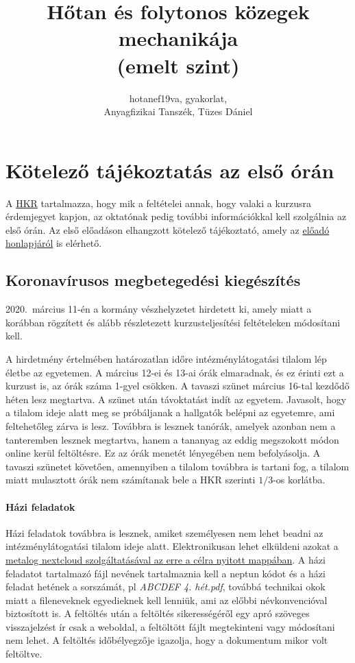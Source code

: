 \documentclass[12pt,a4paper]{scrartcl}
\begin{document}
\title{Hőtan és folytonos közegek mechanikája\\(emelt szint)}
\author{hotanef19va, gyakorlat,\\Anyagfizikai Tanszék, Tüzes Dániel}
\maketitle
\tableofcontents
\section*{Kötelező tájékoztatás az első órán}
A \href{https://www.elte.hu/file/ELTE_SZMSZ_II.pdf}{HKR} tartalmazza, hogy mik a feltételei annak, hogy valaki a kurzusra érdemjegyet kapjon, az oktatónak pedig további információkkal kell szolgálnia az első órán. Az első előadáson elhangzott kötelező tájékoztató, amely az \href{http://ispanovity.web.elte.hu/teaching/}{előadó honlapjáról} is elérhető.

\subsection{Koronavírusos megbetegedési kiegészítés}
2020.\ március 11-én a kormány vészhelyzetet hirdetett ki, amely miatt a korábban rögzített és alább részletezett kurzusteljesítési feltételeken módosítani kell.

A hirdetmény értelmében határozatlan időre intézménylátogatási tilalom lép életbe az egyetemen. A március 12-ei és 13-ai órák elmaradnak, és ez érinti ezt a kurzust is, az órák száma 1-gyel csökken. A tavaszi szünet március 16-tal kezdődő héten lesz megtartva. A szünet után távoktatást indít az egyetem. Javasolt, hogy a tilalom ideje alatt meg se próbáljanak a hallgatók belépni az egyetemre, ami feltehetőleg zárva is lesz. Továbbra is lesznek tanórák, amelyek azonban nem a tanteremben lesznek megtartva, hanem a tananyag az eddig megszokott módon online kerül feltöltésre. Ez az órák menetét lényegében nem befolyásolja. A tavaszi szünetet követően, amennyiben a tilalom továbbra is tartani fog, a tilalom miatt mulasztott órák nem számítanak bele a HKR szerinti $1/3$-os korlátba.

\paragraph{Házi feladatok} Házi feladatok továbbra is lesznek, amiket személyesen nem lehet beadni az intézménylátogatási tilalom ideje alatt. Elektronikusan lehet elküldeni azokat a \href{https://metalog.elte.hu/nextcloud/index.php/s/kBrEWKzdcGWSmsY}{metalog nextcloud szolgáltatásával az erre a célra nyitott mappában}. A házi feladatot tartalmazó fájl nevének tartalmaznia kell a neptun kódot és a házi feladat hetének a sorszámát, pl \textit{ABCDEF 4. hét.pdf}, továbbá technikai okok miatt a fileneveknek egyedieknek kell lenniük, ami az előbbi névkonvencióval biztosított is. A feltöltés után a feltöltés sikerességéről egy apró szöveges visszajelzést ír csak a weboldal, a feltöltött fájlt megtekinteni vagy módosítani nem lehet. A feltöltés időbélyegzője igazolja, hogy a dokumentum mikor volt feltöltve.
\end{document}
